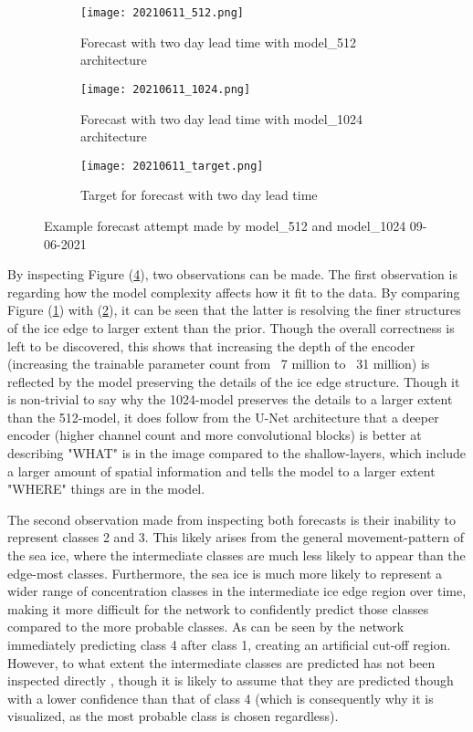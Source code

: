 \documentclass[../main/thesis]{subfiles}
\begin{document}
\begin{figure}
    \begin{subfigure}{0.49\textwidth}
        \texttt{[image: 20210611\_512.png]}
        \caption{\label{fig:model51220210611}Forecast with two day lead time with model\_512 architecture}
    \end{subfigure}
    \hfill
    \begin{subfigure}{0.49\textwidth}
        \texttt{[image: 20210611\_1024.png]}
        \caption{\label{fig:model102420210611}Forecast with two day lead time with model\_1024 architecture}
    \end{subfigure}
    \begin{subfigure}{\textwidth}
        \texttt{[image: 20210611\_target.png]}
        \caption{\label{fig:target20210611}Target for forecast with two day lead time}
    \end{subfigure}
       \caption{\label{fig:20210611}Example forecast attempt made by model\_512 and model\_1024 09-06-2021}
\end{figure}

By inspecting Figure (\ref{fig:20210611}), two observations can be made. The first observation is regarding how the model complexity affects how it fit to the data. By comparing Figure (\ref{fig:model51220210611}) with (\ref{fig:model102420210611}), it can be seen that the latter is resolving the finer structures of the ice edge to larger extent than the prior. Though the overall correctness is left to be discovered, this shows that increasing the depth of the encoder (increasing the trainable parameter count from ~7 million to ~31 million) is reflected by the model preserving the details of the ice edge structure. Though it is non-trivial to say why the 1024-model preserves the details to a larger extent than the 512-model, it does follow from the U-Net architecture that a deeper encoder (higher channel count and more convolutional blocks) is better at describing "WHAT" is in the image compared to the shallow-layers, which include a larger amount of spatial information and tells the model to a larger extent "WHERE" things are in the model. 

The second observation made from inspecting both forecasts is their inability to represent classes 2 and 3. This likely arises from the general movement-pattern of the sea ice, where the intermediate classes are much less likely to appear than the edge-most classes. Furthermore, the sea ice is much more likely to represent a wider range of concentration classes in the intermediate ice edge region over time, making it more difficult for the network to confidently predict those classes compared to the more probable classes. As can be seen by the network immediately predicting class 4 after class 1, creating an artificial cut-off region. However, to what extent the intermediate classes are predicted has not been inspected directly , though it is likely to assume that they are predicted though with a lower confidence than that of class 4 (which is consequently why it is visualized, as the most probable class is chosen regardless).
\end{document}
